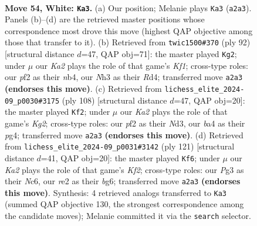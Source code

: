 \documentclass[11pt]{article}
\begin{document}
\clearpage

\begin{figure}[p]\centering
\begin{subfigure}{0.46\textwidth}\centering
\resizebox{\linewidth}{!}{%
\newchessgame
\chessboard[
  setfen={3r4/6k1/1p6/p1p5/b1N5/2P3PN/K3rp1P/7R w - - 4 54},
  showmover=false,
  pgfstyle=straightmove, color=movearrow, markmove={a2-a3}
]}
\caption{}
\end{subfigure}\hfill
\begin{subfigure}{0.46\textwidth}\centering
\resizebox{\linewidth}{!}{%
\newchessgame
\chessboard[
  setfen={8/5kp1/4p2p/3pP2P/1n1R1Np1/8/5P2/1r3K2 w - - 0 47},
  showmover=false,
  pgfstyle=straightmove, color=movearrow, markmove={f1-g2}
]}
\caption{}
\end{subfigure}
\\[4pt]
\begin{subfigure}{0.46\textwidth}\centering
\resizebox{\linewidth}{!}{%
\newchessgame
\chessboard[
  setfen={8/6k1/4p3/4N1b1/1p2P1pp/1P1N2r1/P5K1/8 w - - 0 55},
  showmover=false,
  pgfstyle=straightmove, color=movearrow, markmove={g2-f2}
]}
\caption{}
\end{subfigure}\hfill
\begin{subfigure}{0.46\textwidth}\centering
\resizebox{\linewidth}{!}{%
\newchessgame
\chessboard[
  setfen={3r4/5k1P/2n3B1/1p1p2R1/pP3PP1/P7/3K4/8 b - - 4 61},
  showmover=false,
  pgfstyle=straightmove, color=movearrow, markmove={f7-f6}
]}
\caption{}
\end{subfigure}
\caption{\textbf{Move 54, White: \texttt{Ka3}.} (a) Our position; Melanie plays \texttt{Ka3} (\texttt{a2a3}). Panels (b)--(d) are the retrieved master positions whose correspondence most drove this move (highest QAP objective among those that transfer to it). (b) Retrieved from \texttt{twic1500\#370} (ply 92) [structural distance $d$=47, QAP obj=71]: the master played \texttt{Kg2}; under $\mu$ our \emph{Ka2} plays the role of that game's \emph{Kf1}; cross-type roles: our \emph{p}f2 as their \emph{n}b4, our \emph{N}h3 as their \emph{R}d4; transferred move \texttt{a2a3} \textbf{(endorses this move)}. (c) Retrieved from \texttt{lichess\_elite\_2024-09\_p0030\#3175} (ply 108) [structural distance $d$=47, QAP obj=20]: the master played \texttt{Kf2}; under $\mu$ our \emph{Ka2} plays the role of that game's \emph{Kg2}; cross-type roles: our \emph{p}f2 as their \emph{N}d3, our \emph{b}a4 as their \emph{p}g4; transferred move \texttt{a2a3} \textbf{(endorses this move)}. (d) Retrieved from \texttt{lichess\_elite\_2024-09\_p0031\#3142} (ply 121) [structural distance $d$=41, QAP obj=20]: the master played \texttt{Kf6}; under $\mu$ our \emph{Ka2} plays the role of that game's \emph{Kf2}; cross-type roles: our \emph{P}g3 as their \emph{N}c6, our \emph{r}e2 as their \emph{b}g6; transferred move \texttt{a2a3} \textbf{(endorses this move)}. Synthesis: 4 retrieved analogs transferred to \texttt{Ka3} (summed QAP objective 130, the strongest correspondence among the candidate moves); Melanie committed it via the \texttt{search} selector.}
\label{fig:thought-m106}
\end{figure}
\end{document}
